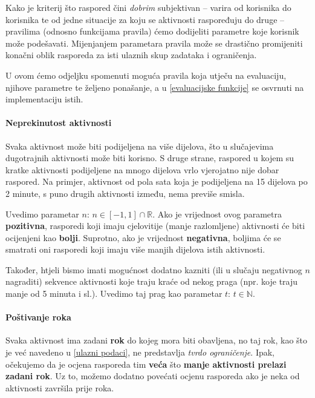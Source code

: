 \documentclass[times, utf8, zavrsni]{fer}
\begin{document}
Kako je kriterij što raspored čini \textit{dobrim} subjektivan -- varira od korisnika do korisnika te od jedne situacije za koju se aktivnosti raspoređuju do druge -- pravilima (odnosno funkcijama pravila) ćemo dodijeliti parametre koje korisnik može podešavati. Mijenjanjem parametara pravila može se drastično promijeniti konačni oblik rasporeda za isti ulaznih skup zadataka i ograničenja.%

U ovom ćemo odjeljku spomenuti moguća pravila koja utječu na evaluaciju, njihove parametre te željeno ponašanje, a u \ref{evaluacijske funkcije} se osvrnuti na implementaciju istih.

\paragraph{Neprekinutost aktivnosti} Svaka aktivnost može biti podijeljena na više dijelova, što u slučajevima dugotrajnih aktivnosti može biti korisno. S druge strane, raspored u kojem su kratke aktivnosti podijeljene na mnogo dijelova vrlo vjerojatno nije dobar raspored. Na primjer, aktivnost od pola sata koja je podijeljena na 15 dijelova po 2 minute, s puno drugih aktivnosti između, nema previše smisla.

Uvedimo parametar $n$: $n \in \left[-1,1\right] \cap \mathbb{R}$. Ako je vrijednost ovog parametra \textbf{pozitivna}, rasporedi koji imaju cjelovitije (manje razlomljene) aktivnosti će biti ocijenjeni kao \textbf{bolji}. Suprotno, ako je vrijednost \textbf{negativna}, boljima će se smatrati oni rasporedi koji imaju više manjih dijelova istih aktivnosti.

Također, htjeli bismo imati mogućnost dodatno kazniti (ili u slučaju negativnog $n$ nagraditi) sekvence aktivnosti koje traju kraće od nekog praga (npr. koje traju manje od 5 minuta i sl.). Uvedimo taj prag kao parametar $t$: $t \in \mathbb{N}$.

\paragraph{Poštivanje roka} Svaka aktivnost ima zadani \textbf{rok} do kojeg mora biti obavljena, no taj rok, kao što je već navedeno u \ref{ulazni podaci}, ne predstavlja \textit{tvrdo ograničenje}. Ipak, očekujemo da je ocjena rasporeda tim \textbf{veća} što \textbf{manje aktivnosti prelazi zadani rok}. Uz to, možemo dodatno povećati ocjenu rasporeda ako je neka od aktivnosti završila prije roka.
\end{document}
